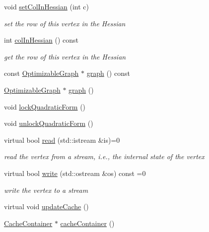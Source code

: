 \begin{DoxyCompactItemize}
void \mbox{\hyperlink{classg2o_1_1_optimizable_graph_1_1_vertex_aa605891d46b99ed97accf659f10bc8d5}{set\+Col\+In\+Hessian}} (int c)
\begin{DoxyCompactList}\small\item\em set the row of this vertex in the Hessian \end{DoxyCompactList}\item 
int \mbox{\hyperlink{classg2o_1_1_optimizable_graph_1_1_vertex_a4d22b2e6832ae2ec040bfc0acb4cabb9}{col\+In\+Hessian}} () const
\begin{DoxyCompactList}\small\item\em get the row of this vertex in the Hessian \end{DoxyCompactList}\item 
const \mbox{\hyperlink{structg2o_1_1_optimizable_graph}{Optimizable\+Graph}} $\ast$ \mbox{\hyperlink{classg2o_1_1_optimizable_graph_1_1_vertex_a8cf4be7e2442444d9d43a80cc8388b1e}{graph}} () const
\item 
\mbox{\hyperlink{structg2o_1_1_optimizable_graph}{Optimizable\+Graph}} $\ast$ \mbox{\hyperlink{classg2o_1_1_optimizable_graph_1_1_vertex_a3f845c6f0ba9a87ab15caaddba5a4037}{graph}} ()
\item 
void \mbox{\hyperlink{classg2o_1_1_optimizable_graph_1_1_vertex_a2eb3dbe08fd20ca8feeeaecc63ce240c}{lock\+Quadratic\+Form}} ()
\item 
void \mbox{\hyperlink{classg2o_1_1_optimizable_graph_1_1_vertex_a5badd602625433ee1ce8e2aa7bb3b2ac}{unlock\+Quadratic\+Form}} ()
\item 
virtual bool \mbox{\hyperlink{classg2o_1_1_optimizable_graph_1_1_vertex_a356c40d33c3f1e07afa938dfb4870230}{read}} (std\+::istream \&is)=0
\begin{DoxyCompactList}\small\item\em read the vertex from a stream, i.\+e., the internal state of the vertex \end{DoxyCompactList}\item 
virtual bool \mbox{\hyperlink{classg2o_1_1_optimizable_graph_1_1_vertex_a4cac277db656fddb5f844d9009d601eb}{write}} (std\+::ostream \&os) const =0
\begin{DoxyCompactList}\small\item\em write the vertex to a stream \end{DoxyCompactList}\item 
virtual void \mbox{\hyperlink{classg2o_1_1_optimizable_graph_1_1_vertex_ab5972c8ba6834c4dcb8a2319e9bf3070}{update\+Cache}} ()
\item 
\mbox{\hyperlink{classg2o_1_1_cache_container}{Cache\+Container}} $\ast$ \mbox{\hyperlink{classg2o_1_1_optimizable_graph_1_1_vertex_ab381120a2c00fc8ae90e5c298dfbb967}{cache\+Container}} ()
\end{DoxyCompactItemize}
